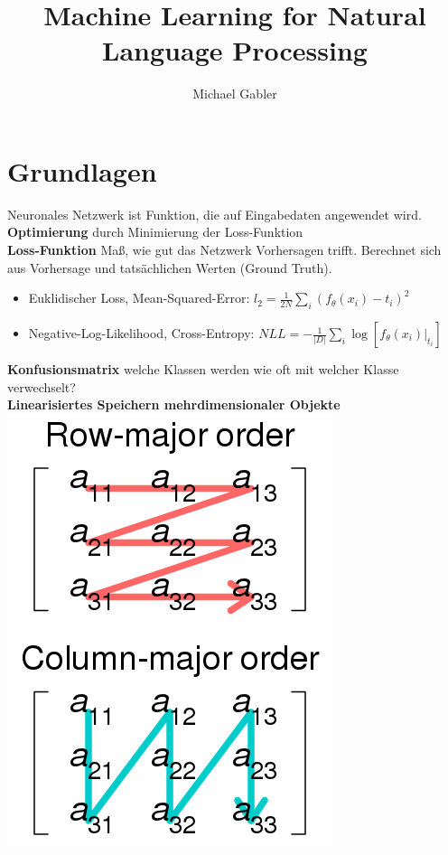 \documentclass[12pt]{article}
\begin{document}
	\title{Machine Learning for Natural Language Processing}
	\author{Michael Gabler}
	\maketitle
	\tableofcontents
	\newpage

	\section{Grundlagen}
	Neuronales Netzwerk ist Funktion, die auf Eingabedaten angewendet wird.\\
	\textbf{Optimierung} durch Minimierung der Loss-Funktion\\
	\textbf{Loss-Funktion} Maß, wie gut das Netzwerk Vorhersagen trifft. Berechnet sich aus Vorhersage und tatsächlichen Werten (Ground Truth).
	\begin{itemize}
		\item Euklidischer Loss, Mean-Squared-Error: $l_2 = \frac{1}{2N} \sum_i (f_\theta(x_i)-t_i)^2$
		\item Negative-Log-Likelihood, Cross-Entropy: $NLL = -\frac{1}{|D|}\sum_i \log[f_\theta(x_i)|_{t_i}]$
	\end{itemize}
	\textbf{Konfusionsmatrix} welche Klassen werden wie oft mit welcher Klasse verwechselt?\\
	\textbf{Linearisiertes Speichern mehrdimensionaler Objekte}\\
	\includegraphics[width=0.25\linewidth]{figures/row-column-major.png}\\

	
\end{document}
